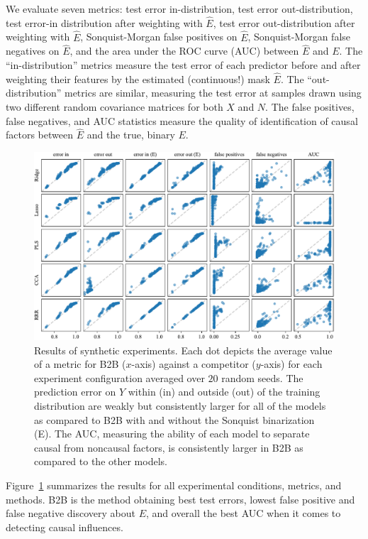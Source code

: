 We evaluate seven metrics:
%
test error in-distribution, test error out-distribution, test error-in
distribution after weighting with $\hat{E}$, test error out-distribution after
weighting with $\hat{E}$, Sonquist-Morgan false positives on $\hat{E}$,
Sonquist-Morgan false negatives on $\hat{E}$, and the area under the ROC curve
(AUC) between $\hat{E}$ and $E$.
%
The ``in-distribution'' metrics measure the test error of each predictor before
and after weighting their features by the estimated (continuous!) mask
$\hat{E}$.
%
The ``out-distribution'' metrics are similar, measuring the test error at
samples drawn using two different random covariance matrices for both $X$ and
$N$.
%
The false positives, false negatives, and AUC statistics measure the quality of
identification of causal factors between $\hat{E}$ and the true, binary $E$.

\begin{figure}[htpb] \centering
\includegraphics[width=\textwidth]{synthetic.pdf} \caption{Results of synthetic
experiments. Each dot depicts the average value of a metric for B2B ($x$-axis)
against a competitor ($y$-axis) for each experiment configuration averaged over
$20$ random seeds. The prediction error on $Y$ within (in) and outside (out) of
the training distribution are weakly but consistently larger for all of the
models as compared to B2B with and without the Sonquist binarization (E). The
AUC, measuring the ability of each model to separate causal from noncausal
factors, is consistently larger in B2B as compared to the other models.}
\label{table:synthetic} \end{figure} \fi

Figure~\ref{table:synthetic} summarizes the results for all experimental
conditions, metrics, and methods.
%
B2B is the method obtaining best test errors, lowest false positive and false
negative discovery about $E$, and overall the best AUC when it comes to
detecting causal influences.

